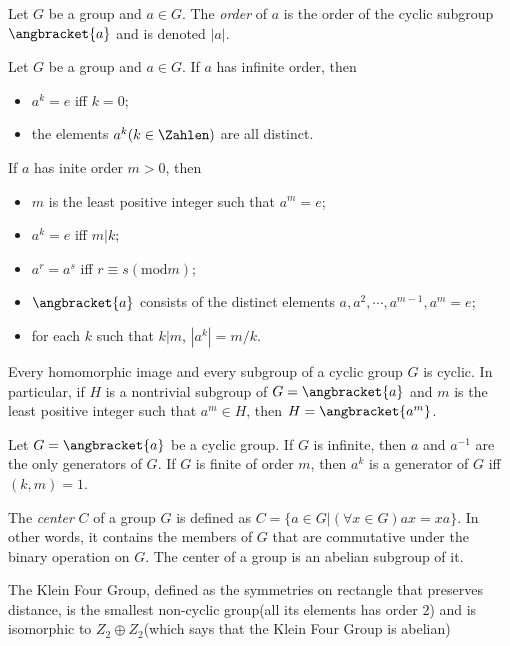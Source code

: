 \begin{definition}
	Let $ G $ be a group and $ a \in G $. The \textit{order} of $ a $ is the order of the cyclic subgroup $ \angbracket{a} $ and is denoted $ |a| $.
\end{definition}
\begin{theorem}
	Let $ G $ be a group and $ a \in G $. If $ a $ has infinite order, then
	\begin{itemize}
		\item $ a^k=e $ iff $ k=0 $;
		\item the elements $ a^k (k \in \Zahlen) $ are all distinct.
	\end{itemize}
If $ a $ has inite order $ m>0 $, then
\begin{itemize}
	\item $ m $ is the least positive integer such that $ a^m=e $;
	\item $ a^k=e $ iff $ m|k $;
	\item $ a^r = a^s $ iff $ r \equiv s(\text{mod} m) $;
	\item $ \angbracket{a} $ consists of the distinct elements $ a,a^2,\cdots,a^{m-1},a^m=e $;
	\item for each $ k $ such that $ k|m $, $ |a^k| = m/k $.
\end{itemize}
\end{theorem}
\begin{theorem}
	Every homomorphic image and every subgroup of a cyclic group $ G $ is cyclic. In particular, if $ H $ is a nontrivial subgroup of $ G = \angbracket{a} $ and $ m $ is the least positive integer such that $ a^m \in H $, then $ H = \angbracket{a^m} $.
\end{theorem}
\begin{theorem}
	Let $ G = \angbracket{a} $ be a cyclic group. If $ G $ is infinite, then $ a $ and $ a^{-1} $ are the only generators of $ G $. If $ G $ is finite of order $ m $, then $ a^k $ is a generator of $ G $ iff $ (k,m)=1 $.
\end{theorem}
\begin{definition}
	The \textit{center} $ C $ of a group $ G $ is defined as $ C=\{a \in G |(\forall x \in G)ax=xa \} $. In other words, it contains the members of $ G $ that are commutative under the binary operation on $ G $. The center of a group is an abelian subgroup of it.
\end{definition}
\begin{definition}
	The Klein Four Group, defined as the symmetries on rectangle that preserves distance, is the smallest non-cyclic group(all its elements has order $ 2 $) and is isomorphic to $ Z_2 \oplus Z_2 $(which says that the Klein Four Group is abelian)
\end{definition}

